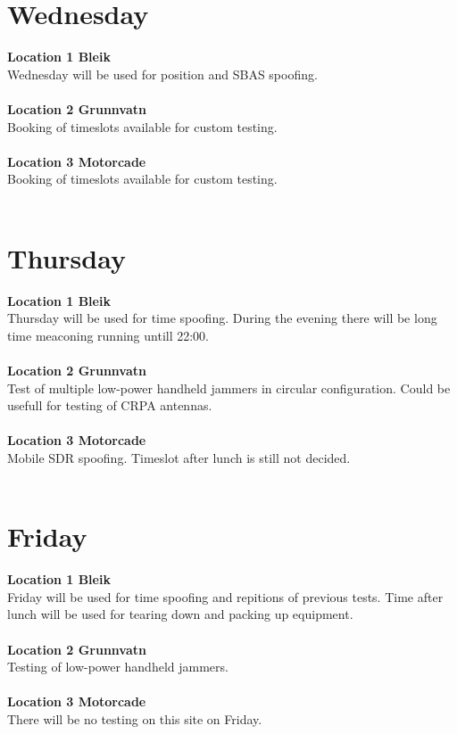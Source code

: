 \documentclass[a4paper]{book}
\begin{document}
\begin{landscape}
\chapter{Wednesday}
\Large \textbf{Location 1 Bleik} \\
Wednesday will be used for position and SBAS spoofing. \\ \\
\Large \textbf{Location 2 Grunnvatn} \\
Booking of timeslots available for custom testing.\\ \\
\Large \textbf{Location 3 Motorcade} \\
Booking of timeslots available for custom testing.\\ \\

%

\chapter{Thursday}
\Large \textbf{Location 1 Bleik} \\
Thursday will be used for time spoofing. During the evening there will be long time meaconing running untill 22:00.\\ \\
\Large \textbf{Location 2 Grunnvatn} \\
Test of multiple low-power handheld jammers in circular configuration. Could be usefull for testing of CRPA antennas.\\ \\
\Large \textbf{Location 3 Motorcade} \\
Mobile SDR spoofing. Timeslot after lunch is still not decided.\\ \\

%

\chapter{Friday}
\Large \textbf{Location 1 Bleik} \\
Friday will be used for time spoofing and repitions of previous tests. Time after lunch will be used for tearing down and packing up equipment.\\ \\
\Large \textbf{Location 2 Grunnvatn} \\
Testing of low-power handheld jammers.\\ \\
\Large \textbf{Location 3 Motorcade} \\
There will be no testing on this site on Friday.\\ \\

%

\end{landscape}
\end{document}

